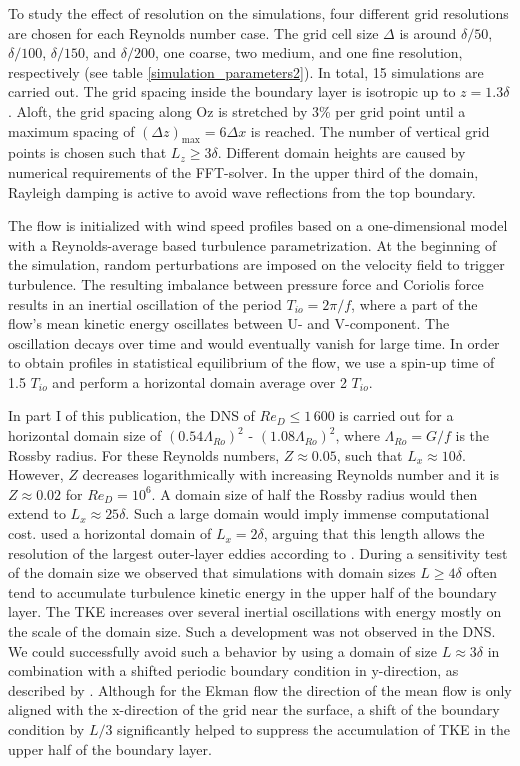 \documentclass[smallcondensed,draft]{svjour3}
\begin{document}
To study the effect of resolution on the simulations, four different grid resolutions are chosen for each Reynolds number case. The grid cell size $\Delta$ is around $\delta/50$, $\delta/100$, $\delta/150$, and $\delta/200$, one coarse, two medium, and one fine resolution, respectively (see table \ref{simulation_parameters2}). In total, 15 simulations are carried out. The grid spacing inside the boundary layer is isotropic up to $z = 1.3\delta$. Aloft, the grid spacing along Oz is stretched by 3\% per grid point until a maximum spacing of $(\Delta z )_\mathrm{max} = 6\Delta x$ is reached. The number of vertical grid points is chosen such that $L_z \ge 3 \delta$. Different domain heights are caused by numerical requirements of the FFT-solver. In the upper third of the domain, Rayleigh damping is active to avoid wave reflections from the top boundary.

The flow is initialized with wind speed profiles based on a one-dimensional model with a Reynolds-average based turbulence parametrization. At the beginning of the simulation, random perturbations are imposed on the velocity field to trigger turbulence. The resulting imbalance between pressure force and Coriolis force results in an inertial oscillation of the period $T_{io}=2\pi/f$, where a part of the flow's mean kinetic energy oscillates between U- and V-component. The oscillation decays over time and would eventually vanish for large time. In order to obtain profiles in statistical equilibrium of the flow, we use a spin-up time of 1.5 $T_{io}$ and perform a horizontal domain average over 2 $T_{io}$.

In part I of this publication, the DNS of $Re_D\leq1\,600$ is carried out for a horizontal domain size of $(0.54\Lambda_{Ro})^2$ - $(1.08\Lambda_{Ro})^2$, where $\Lambda_{Ro}=G/f$ is the Rossby radius. For these Reynolds numbers, $Z\approx 0.05$, such that $L_x \approx 10 \delta$. However, $Z$ decreases logarithmically with increasing Reynolds number and it is $Z\approx 0.02$ for $Re_D=10^6$. A domain size of half the Rossby radius would then extend to $L_x\approx 25\delta$. Such a large domain would imply immense computational cost. \cite{spalart2008direct} used a horizontal domain of $L_x = 2\delta$, arguing that this length allows the resolution of the largest outer-layer eddies according to \cite{csanady1967resistance}. During a sensitivity test of the domain size we observed that simulations with domain sizes $L\geq 4\delta$ often tend to accumulate turbulence kinetic energy in the upper half of the boundary layer. The TKE increases over several inertial oscillations with energy mostly on the scale of the domain size. Such a development was not observed in the DNS. We could successfully avoid such a behavior by using a domain of size $L \approx 3\delta$ in combination with a shifted periodic boundary condition in y-direction, as described by \cite{munters2016shifted}. Although for the Ekman flow the direction of the mean flow is only aligned with the x-direction of the grid near the surface, a shift of the boundary condition by $L/3$ significantly helped to suppress the accumulation of TKE in the upper half of the boundary layer.
\end{document}
